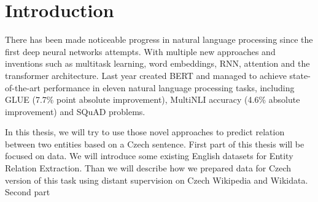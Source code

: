\chapter*{Introduction}


There has been made noticeable progress in natural language processing since the first deep neural networks attempts. With multiple new approaches and  inventions such as multitask learning, word embeddings, RNN, attention and the transformer architecture.   Last year \cite{devlin2018bert} created BERT and managed to achieve state-of-the-art performance in eleven natural language processing tasks, including GLUE (7.7\% point absolute improvement), MultiNLI accuracy (4.6\% absolute improvement) and SQuAD problems.


In this thesis, we will try to use those novel approaches to predict relation between two entities based on a Czech sentence. First part of this thesis will be focused on data. We will  introduce some existing English datasets for Entity Relation Extraction. Than we will describe how we prepared data for Czech version of this task using distant supervision on Czech Wikipedia and Wikidata. Second part 

